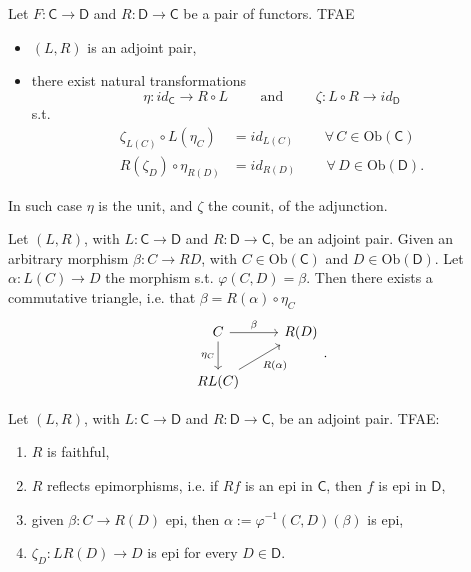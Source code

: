 \begin{prop}
	Let $F: \mathsf{C} \to \mathsf{D}$ and $R: \mathsf{D} \to \mathsf{C}$ be a pair of functors.
	TFAE
	\begin{itemize}
		\item $\left(L, R\right)$ is an adjoint pair,
		\item there exist natural transformations
			\begin{equation}
			\eta: id_{\mathsf{C}} \to R \circ L \qquad \text{ and }\qquad \zeta: L \circ R \to id_{\mathsf{D}}
			\end{equation} 
			s.t.
			\begin{align}
				\zeta_{L(C)} \circ L(\eta_C) &= id_{L(C)} \qquad
				\,\forall\, C \in \mathrm{Ob} \left(\mathsf{C}\right)\\
				R(\zeta_D) \circ \eta_{R(D)} &= id_{R(D)} \qquad
				\,\forall\, D \in \mathrm{Ob} \left(\mathsf{D}\right)
			.\end{align} 
	\end{itemize}
	In such case $\eta$ is the unit, and $\zeta$ the counit, of the adjunction.
\end{prop} 

\begin{rem}
	Let $\left(L, R\right)$, with $L: \mathsf{C} \to \mathsf{D}$ and $R: \mathsf{D} \to \mathsf{C}$, be an adjoint pair.
	Given an arbitrary morphism $\beta: C \to RD$, with $C \in \mathrm{Ob} \left(\mathsf{C}\right)$ and
	$D \in \mathrm{Ob} \left(\mathsf{D}\right)$.
	Let $\alpha: L(C) \to D$ the morphism s.t. $\varphi(C,D) = \beta$.
	Then there exists a commutative triangle, i.e. that $\beta = R(\alpha) \circ\eta_C$
	\begin{equation}
	\begin{tikzcd}
		C \arrow[r, "\beta", rightarrow] \arrow[d, "\eta_C"', rightarrow] &
		R(D)\\
		RL(C) \arrow[ru, "{R(\alpha)}"', rightarrow] &
	\end{tikzcd}
	.\end{equation} 
\end{rem} 

\begin{rem}[]
	Let $\left(L, R\right)$, with $L: \mathsf{C} \to \mathsf{D}$ and $R: \mathsf{D} \to \mathsf{C}$, be an adjoint pair.
	TFAE:
	\begin{enumerate}
		\item $R$ is faithful,
		\item $R$ reflects epimorphisms, i.e. if $Rf$ is an epi in $\mathsf{C}$,
			then $f$ is epi in $\mathsf{D}$,
		\item given $\beta: C \to R(D)$ epi, then $\alpha := \varphi^{-1}(C,D)(\beta)$ is epi,
		\item $\zeta_D: LR(D) \to D$ is epi for every $D \in \mathsf{D}$.
	\end{enumerate}
\end{rem}

